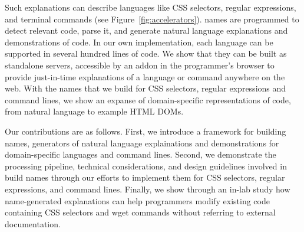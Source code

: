 Such explanations can describe languages like CSS selectors, regular expressions, and terminal commands (see Figure~\ref{fig:accelerators}).
\Glspl{name} are programmed to detect relevant code, parse it, and generate natural language explanations and demonstrations of code. 
In our own implementation, each language can be supported in several hundred lines of code.
We show that they can be built as standalone servers, accessible by an addon in the programmer's browser to provide just-in-time explanations of a language or command anywhere on the web.
With the \glspl{name} that we build for CSS selectors, regular expressions and command lines, we show an expanse of domain-specific representations of code, from natural language to example HTML DOMs.

Our contributions are as follows.
First, we introduce a framework for building \Glspl{name}, generators of natural language explainations and demonstrations for domain-specific languages and command lines.
Second, we demonstrate the processing pipeline, technical considerations, and design guidelines involved in build \glspl{name} through our efforts to implement them for CSS selectors, regular expressions, and command lines.
Finally, we show through an in-lab study how \gls{name}-generated explanations can help programmers modify existing code containing CSS selectors and wget commands without referring to external documentation.